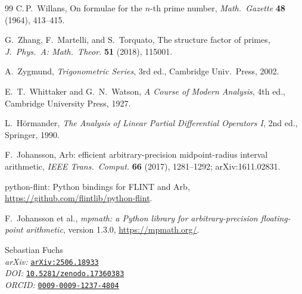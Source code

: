 \begin{thebibliography}{99}
C.\,P.~Willans, On formulae for the $n$-th prime number, \emph{Math.\ Gazette} \textbf{48} (1964), 413–415.

G.~Zhang, F.~Martelli, and S.~Torquato,
The structure factor of primes,
\emph{J.\ Phys.\ A: Math.\ Theor.} \textbf{51} (2018), 115001.

A.~Zygmund, \emph{Trigonometric Series}, 3rd ed., Cambridge Univ.\ Press, 2002.

E.~T.~Whittaker and G.~N.~Watson, \emph{A Course of Modern Analysis}, 4th ed., Cambridge University Press, 1927.

L.~H\"ormander, \emph{The Analysis of Linear Partial Differential Operators I}, 2nd ed., Springer, 1990.

F.~Johansson, Arb: efficient arbitrary-precision midpoint-radius interval arithmetic, \emph{IEEE Trans.\ Comput.} \textbf{66} (2017), 1281--1292; arXiv:1611.02831.

python-flint: Python bindings for FLINT and Arb, \url{https://github.com/flintlib/python-flint}.

F.~Johansson et al., \emph{mpmath: a Python library for arbitrary-precision floating-point arithmetic}, version 1.3.0, \url{https://mpmath.org/}.

\end{thebibliography}



\vfill
\par\noindent
\small
Sebastian Fuchs \\[1ex]
\textit{arXiv:} \texttt{\href{https://arxiv.org/abs/2506.18933}{arXiv:2506.18933}} \\
\textit{DOI:} \texttt{\href{https://doi.org/10.5281/zenodo.17360383}{10.5281/zenodo.17360383}} \\ 
\textit{ORCID:} \texttt{\href{https://orcid.org/0009-0009-1237-4804}{0009-0009-1237-4804}} \\

